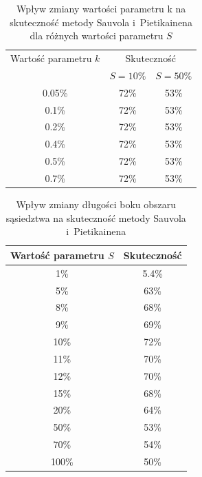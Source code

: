 \begin {table}
  \begin{center}
    \begin{tabular}{c | c | c}
      Wartość parametru $k$ & \multicolumn{2}{c}{Skuteczność} \\
      \cline{2-3}
      & $S = 10\%$ & $S = 50\%$ \\
      \hline
      0.05\% & 72\% & 53\% \\
      0.1\% & 72\% & 53\% \\
      0.2\% & 72\% & 53\% \\
      0.4\% & 72\% & 53\% \\
      0.5\% & 72\% & 53\% \\
      0.7\% & 72\% & 53\%
    \end{tabular}
    \caption {Wpływ zmiany wartości parametru k na skuteczność metody Sauvola i~Pietikainena dla różnych wartości parametru $S$}
    \label{tab:sauvol_pietikainen_parametr_k} 
  \end{center}
\end {table}

\begin {table}
  \begin{center}
    \begin{tabular}{c | c}
      Wartość parametru $S$ & Skuteczność \\
      \hline
      1\% & 5.4\% \\
      5\% & 63\% \\
      8\% & 68\% \\
      9\% & 69\% \\
      10\% & 72\% \\
      11\% & 70\% \\
      12\% & 70\% \\
      15\% & 68\% \\
      20\% & 64\% \\
      50\% & 53\% \\
      70\% & 54\% \\
      100\% & 50\%
    \end{tabular}
    \caption {Wpływ zmiany długości boku obszaru sąsiedztwa na skuteczność metody Sauvola i~Pietikainena}
    \label{tab:sauvol_pietikainen_dlugosc_boku} 
  \end{center}
\end {table}

